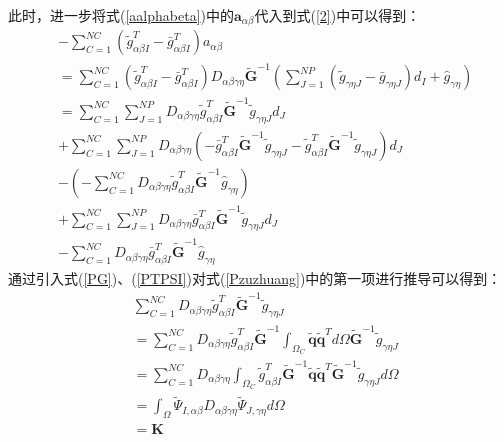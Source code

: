 此时，进一步将式(\ref{aalphabeta})中的$\pmb{a}_{\alpha\beta}$代入到式(\ref{2})中可以得到：
\begin{equation}
\begin{split}\label{Pzuzhuang}
    &-\sum_{C=1}^{N\!C}(\tilde{g}_{\alpha\beta I}^T-\bar{g}_{\alpha\beta I}^T)a_{\alpha\beta}\\
    &=\sum_{C=1}^{N\!C}(\tilde{g}_{\alpha\beta I}^T-\bar{g}_{\alpha\beta I}^T)D_{\alpha\beta\gamma\eta}\tilde{\pmb{G}}^{-1}(\sum_{J=1}^{N\!P}(\tilde{g}_{\gamma\eta J}-\bar{g}_{\gamma\eta J})d_I+\hat{g}_{\gamma\eta})\\
    &=\sum_{C=1}^{N\!C}\sum_{J=1}^{N\!P}D_{\alpha\beta\gamma\eta}\tilde{g}_{\alpha\beta I}^T\tilde{\pmb G}^{-1}\tilde{g}_{\gamma\eta J}d_J\\
    &+\sum_{C=1}^{N\!C}\sum_{J=1}^{N\!P}D_{\alpha\beta\gamma\eta}(-\bar{g}_{\alpha\beta I}^T\tilde{\pmb G}^{-1}\tilde{g}_{\gamma\eta J}-\tilde{g}_{\alpha\beta I}^T\tilde{\pmb G}^{-1}\tilde{g}_{\gamma\eta J})d_J\\
    &-(-\sum_{C=1}^{N\!C}D_{\alpha\beta\gamma\eta}\tilde{g}_{\alpha\beta I}^T\tilde{\pmb G}^{-1}\hat{g}_{\gamma\eta })\\
    &+\sum_{C=1}^{N\!C}\sum_{J=1}^{N\!P}D_{\alpha\beta\gamma\eta}\bar{g}_{\alpha\beta I}^T\tilde{\pmb G}^{-1}\tilde{g}_{\gamma\eta J}d_J\\
    &-\sum_{C=1}^{N\!C}D_{\alpha\beta\gamma\eta}\bar{g}_{\alpha\beta I}^T\tilde{\pmb G}^{-1}\hat{g}_{\gamma\eta }
\end{split}
\end{equation}
通过引入式(\ref{PG})、(\ref{PTPSI})对式(\ref{Pzuzhuang})中的第一项进行推导可以得到：
\begin{equation}
\begin{split}
    &\sum_{C=1}^{N\!C}D_{\alpha\beta\gamma\eta}\tilde{g}_{\alpha\beta I}^T\tilde{\pmb G}^{-1}\tilde{g}_{\gamma\eta J}\\
    &=\sum_{C=1}^{N\!C}D_{\alpha\beta\gamma\eta}\tilde{g}_{\alpha\beta I}^T\tilde{\pmb G}^{-1}\int_{\Omega_C}\tilde{\pmb q}\tilde{\pmb q}^Td\Omega\tilde{\pmb G}^{-1}\tilde{g}_{\gamma\eta J}\\
    &=\sum_{C=1}^{N\!C}D_{\alpha\beta\gamma\eta}\int_{\Omega_C}\tilde{g}_{\alpha\beta I}^T\tilde{\pmb G}^{-1}\tilde{\pmb q}\tilde{\pmb q}^T\tilde{\pmb G}^{-1}\tilde{g}_{\gamma\eta J}d\Omega \\
    &=\int_{\Omega}\tilde{\Psi}_{I,\alpha\beta}D_{\alpha\beta\gamma\eta}\tilde{\Psi}_{J,\gamma\eta}d\Omega \\
    &=\pmb{K}
\end{split}
\end{equation}
